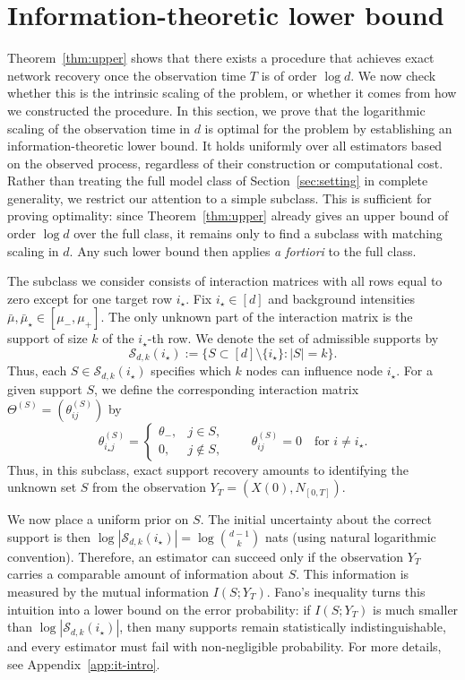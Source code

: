 \documentclass{article}
\begin{document}
\section{Information-theoretic lower bound}\label{sec:lower-bound}

Theorem~\ref{thm:upper} shows that there exists a procedure that achieves exact network recovery once the observation time $T$ is of order $\log d$. We now check whether this is the intrinsic scaling of the problem, or whether it comes from how we constructed the procedure. In this section, we prove that the logarithmic scaling of the observation time in $d$ is optimal for the problem by establishing an information-theoretic lower bound. It holds uniformly over all estimators based on the observed process, regardless of their construction or computational cost.
Rather than treating the full model class of Section~\ref{sec:setting} in complete generality, we restrict our attention to a simple subclass. This is sufficient for proving optimality: since Theorem~\ref{thm:upper} already gives an upper bound of order $\log d$ over the full class, it remains only to find a subclass with matching scaling in $d$. Any such lower bound then applies \textit{a fortiori} to the full class.

The subclass we consider consists of interaction matrices with all rows equal to zero except for one target row $i_\star$. Fix $i_\star\in[d]$ and background intensities $\bar\mu,\bar\mu_\star\in[\mu_-,\mu_+]$. The only unknown part of the interaction matrix is the support of size $k$ of the $i_\star$-th row. We denote the set of admissible supports by
\[
\mathcal S_{d,k}(i_\star)
:=
\{S\subset[d]\setminus\{i_\star\}: |S|=k\}.
\]
Thus, each $S\in\mathcal S_{d,k}(i_\star)$ specifies which $k$ nodes can influence node $i_\star$. For a given support $S$, we define the corresponding interaction matrix $\Theta^{(S)} = (\theta^{(S)}_{ij})$ by
\[
\theta^{(S)}_{i_\star j}
=
\begin{cases}
\theta_-, & j\in S,\\
0, & j\notin S,
\end{cases}
\qquad
\theta^{(S)}_{ij}=0
\quad\text{for } i\neq i_\star.
\]
Thus, in this subclass, exact support recovery amounts to identifying the unknown set $S$ from the observation $Y_T=(X(0),N_{[0,T]})$. 

We now place a uniform prior on $S$. The initial uncertainty about the correct support is then
$
\log |\mathcal S_{d,k}(i_\star)|
=
\log{\binom{d-1}{k}}$ nats (using natural logarithmic convention). Therefore, an estimator can succeed only if the observation $Y_T$ carries a comparable amount of information about $S$. This information is measured by the mutual information $I(S;Y_T)$. Fano's inequality turns this intuition into a lower bound on the error probability: if $I(S;Y_T)$ is much smaller than $\log |\mathcal S_{d,k}(i_\star)|$, then many supports remain statistically indistinguishable, and every estimator must fail with non-negligible probability. For more details, see Appendix~\ref{app:it-intro}.
\end{document}
